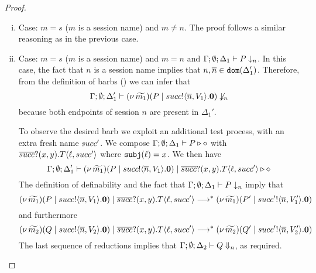 \begin{proof}
\begin{enumerate}[I.]
\begin{enumerate}[i)]
				\item	Case: $m = s$ ($m$ is a session name) and $m \not= n$.
						The proof follows a similar reasoning as in the previous case.

				\item	Case: $m = s$ ($m$ is a session name) and $m = n$ and
						$\Gamma; \emptyset; \Delta_1 \vdash P \downarrow_{n}$.
						In this case, 
						the fact that $n$ is a session name
						implies that $n, \overline{n} \in \mathtt{dom}(\Delta_1')$.
						Therefore, from the definition
						of barbs () we can infer that
						\[
							\Gamma; \emptyset; \Delta_1' \vdash
							(\nu\, \widetilde{m_1})(P \;|\; succ ! \langle \overline{n}, V_1 \rangle . \mathbf{0})
							\not\downarrow_{n}
						\]
						because both endpoints of session $n$ are present in $\Delta_1'$.
						
						To observe the desired barb we exploit an additional test process, with an extra fresh name $succ'$.
						We compose $\Gamma; \emptyset; \Delta_1 \vdash P \triangleright \diamond$ with
						$\overline{succ} ? (x, y) . T\langle \ell, succ' \rangle$
						where $\mathtt{subj}(\ell) = x$. We then have 
						\[
							\Gamma; \emptyset; \Delta_1' \vdash
							(\nu\, \widetilde{m_1})(P \;|\; succ ! \langle \overline{n}, V_1 \rangle . \mathbf{0}) \;|\;
							\overline{succ} ? (x, y) . T\langle \ell, succ' \rangle \triangleright \diamond
						\]
						The definition of definability and the fact that $\Gamma; \emptyset; \Delta_1 \vdash P \downarrow_{n}$
						imply that
						\[
							(\nu\, \widetilde{m_1})(P \;|\; succ ! \langle \overline{n}, V_1 \rangle . \mathbf{0}) \;|\;
							\overline{succ} ? (x,  {y}) . T\langle \ell, succ' \rangle
							\longrightarrow^{*} 
							(\nu\, \widetilde{m_1})(P' \;|\; succ' ! \langle \overline{n}, V_1' \rangle . \mathbf{0})
						\]
						\noi and furthermore
						\[
							(\nu\, \widetilde{m_2})(Q \;|\; succ ! \langle \overline{n}, V_2 \rangle . \mathbf{0}) \;|\;
							\overline{succ} ? (x,  {y}) . T\langle \ell, succ' \rangle
							\longrightarrow^{*} 
							(\nu\, \widetilde{m_2})(Q' \;|\; succ' ! \langle \overline{n}, V_2' \rangle . \mathbf{0})
						\]
						\noi The last sequence of reductions implies that
						$\Gamma; \emptyset; \Delta_2 \vdash Q \Downarrow_{n}$, as required.
				\end{enumerate}
    

\end{enumerate}
\end{proof}
